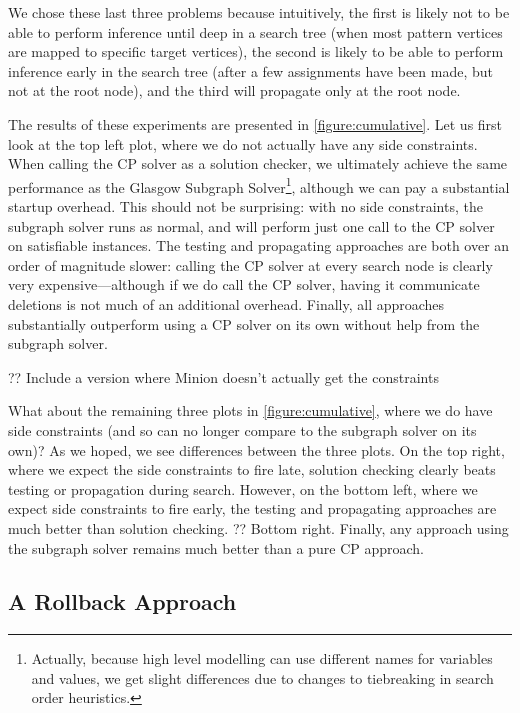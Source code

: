 \documentclass[runningheads]{llncs}
\begin{document}
We chose these last three problems because intuitively, the first is likely not to be able to
perform inference until deep in a search tree (when most pattern vertices are mapped to specific
target vertices), the second is likely to be able to perform inference early in the search tree
(after a few assignments have been made, but not at the root node), and the third will propagate
only at the root node.

The results of these experiments are presented in
\cref{figure:cumulative}. Let us first look at the top left plot, where we do not actually have any side constraints. When calling
the CP solver as a solution checker, we ultimately achieve the same performance as the Glasgow
Subgraph Solver\footnote{Actually, because high level modelling can use different names for
variables and values, we get slight differences due to changes to tiebreaking in search order
heuristics.}, although we can pay a substantial startup overhead. This should not be surprising:
with no side constraints, the subgraph solver runs as normal, and will perform just one call to the
CP solver on satisfiable instances. The testing and propagating approaches are both over an order of
magnitude slower: calling the CP solver at every search node is clearly very expensive---although if
we do call the CP solver, having it communicate deletions is not much of an additional overhead.
Finally, all approaches substantially outperform using a CP solver on its own without help from the
subgraph solver.

?? Include a version where Minion doesn't actually get the constraints

What about the remaining three plots in \cref{figure:cumulative}, where we do have side constraints (and so can no
longer compare to the subgraph solver on its own)? As we hoped, we see differences between the three
plots. On the top right, where we expect the side constraints to fire late, solution
checking clearly beats testing or propagation during search. However, on the bottom left,
where we expect side constraints to fire early, the testing and propagating approaches are much
better than solution checking. ?? Bottom right. Finally, any approach using the subgraph solver
remains much better than a pure CP approach.

\subsection{A Rollback Approach}
\end{document}
